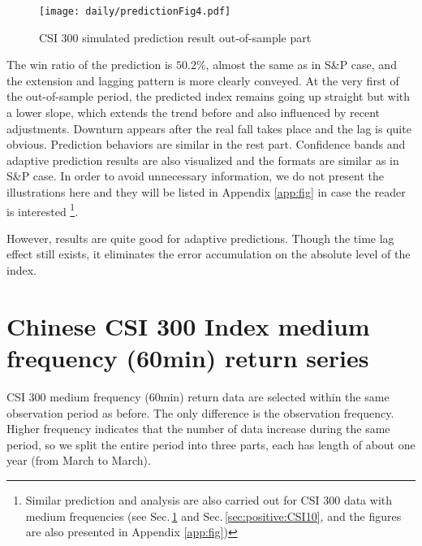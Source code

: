         \begin{figure}[!hbt]
        \center
        \texttt{[image: daily/predictionFig4.pdf]}
        \caption{CSI 300 simulated prediction result out-of-sample part}
        \label{fig:CSI:predictionout}
        \end{figure}
The win ratio of the prediction is $50.2\%$, almost the same as in S\&P case,
and the extension and lagging pattern is more clearly conveyed.
At the very first of the out-of-sample period, 
the predicted index remains going up straight but with a lower slope,
which extends the trend before and also influenced by recent adjustments.
Downturn appears after the real fall takes place and the lag is quite obvious.
Prediction behaviors are similar in the rest part.
Confidence bands and adaptive prediction results are also visualized and 
the formats are similar as in S\&P case.
In order to avoid unnecessary information, 
we do not present the illustrations here and they will be listed in 
Appendix \ref{app:fig} in case the reader is interested
\footnote{Similar prediction and analysis are also carried out for 
CSI 300 data with medium frequencies 
(see Sec.\,\ref{sec:positive:CSI60} and Sec.\,\ref{sec:positive:CSI10},
and the figures are also presented in Appendix \ref{app:fig})}.

However, results are quite good for adaptive predictions.
Though the time lag effect still exists, 
it eliminates the error accumulation on the absolute level of the index.


\section{Chinese CSI 300 Index medium frequency (60min) return series}
\label{sec:positive:CSI60}
CSI 300 medium frequency (60min) return data are selected within 
the same observation period as before.
The only difference is the observation frequency.
Higher frequency indicates that the number of data increase during the same period,
so we split the entire period into three parts,
each has length of about one year (from March to March).


